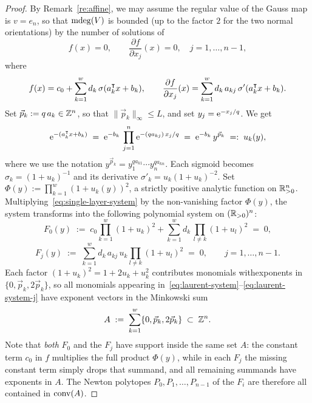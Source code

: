 \begin{proof}
By Remark~\ref{re:affine}, we may assume the regular value of the Gauss map is $v=e_n$, so that $\operatorname{\mathrm{mdeg}}(V)$ is bounded (up to the factor $2$ for the two normal orientations) by the number of solutions of
\begin{equation}\label{eq:single-layer-system}
  f(x) = 0, \qquad \frac{\partial f}{\partial x_j}(x) = 0, \quad j = 1,\ldots, n-1,
\end{equation}
where
\begin{equation}\label{eq:single-layer-f}
  f(x) = c_0 + \sum_{k=1}^w d_k\,\sigma(a_k^{\intercal}x + b_k),
  \qquad
  \frac{\partial f}{\partial x_j}(x) = \sum_{k=1}^w d_k\,a_{kj}\,\sigma'(a_k^{\intercal}x + b_k).
\end{equation}
Set $\vec p_k := q\,a_k\in\mathbb{Z}^n$, so that $\|\vec p_k\|_\infty\leq L$, and set $y_j=\mathrm{e}^{-x_j/q}$. We get
\begin{equation*}
  \mathrm{e}^{-(a_k^{\intercal}x + b_k)}
  \;=\; \mathrm{e}^{-b_k}\,\prod_{j=1}^n \mathrm{e}^{-(qa_{kj})\,x_j/q}
  \;=\; \mathrm{e}^{-b_k}\, y^{\vec p_k}
  \;=:\; u_k(y),
\end{equation*}
where we use the notation $y^{\vec p_k}=y_1^{qa_{k1}}\cdots y_n^{qa_{kn}}$. 
Each sigmoid becomes $\sigma_k = (1+u_k)^{-1}$ and its derivative $\sigma'_k = u_k(1+u_k)^{-2}$. Set $\Phi(y):=\prod_{k=1}^w(1+u_k(y))^2$, a strictly positive analytic function on $\mathbb{R}_{>0}^n$. Multiplying~\eqref{eq:single-layer-system} by the non-vanishing factor $\Phi(y)$, the system transforms into the following polynomial system on $(\mathbb{R}_{>0})^n$:
\begin{equation}\label{eq:laurent-system}
  F_0(y) \;:=\; c_0\prod_{k=1}^w(1+u_k)^2 + \sum_{k=1}^w d_k\, \prod_{l\neq k}(1+u_l)^2 \;=\; 0,
\end{equation}
\begin{equation}\label{eq:laurent-system-j}
  F_j(y) \;:=\; \sum_{k=1}^w d_k\,a_{kj}\,u_k\!\!\prod_{l\neq k}(1+u_l)^2 \;=\; 0, \qquad j=1,\ldots,n-1.
\end{equation}
Each factor $(1+u_k)^2 = 1 + 2u_k + u_k^2$ contributes monomials withexponents in $\{0,\vec p_k,2\vec p_k\}$, so all monomials appearing in~\eqref{eq:laurent-system}--\eqref{eq:laurent-system-j} have exponent vectors in the Minkowski sum
\begin{equation}\label{eq:zonotope-support}
  A \;:=\; \sum_{k=1}^w \{0,\vec p_k,2\vec p_k\} \;\subset\; \mathbb{Z}^n.
\end{equation}
Note that \emph{both} $F_0$ and the $F_j$ have support inside the same set $A$: the constant term $c_0$ in $f$ multiplies the full product $\Phi(y)$, while in each $F_j$ the missing constant term simply drops that summand, and all remaining summands have exponents in $A$. The Newton polytopes $P_0, P_1, \ldots, P_{n-1}$ of the $F_i$ are therefore all contained in $\operatorname{conv}(A)$.


\end{proof}
